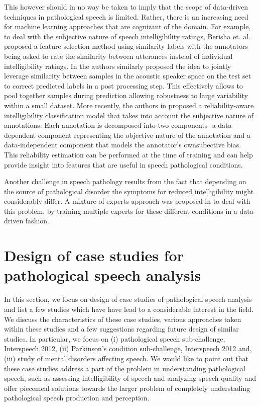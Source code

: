 \documentclass{article}
\begin{document}
This however should in no way be taken to imply that the scope of data-driven techniques in pathological speech is limited. Rather, there is an increasing need for machine learning approaches that are cognizant of the domain. For example, to deal with the subjective nature of speech intelligibility ratings, Berisha et. al. \cite{berisha2014modeling} proposed a feature selection method using similarity labels with the annotators being asked to rate the similarity between utterances instead of individual intelligibility ratings.
In \cite{kim2013pathology} the authors similarly proposed the idea to jointly leverage similarity between samples in the acoustic speaker space on the test set to correct predicted labels in a post processing step. This effectively allows to pool together samples during prediction allowing robustness to large variability within a small dataset.
More recently, the authors in \cite{kumar2015maxentrel} proposed a reliability-aware intelligibility classification model that takes into account the subjective nature of annotations. Each annotation is decomposed into two components- a data dependent component representing the objective nature of the annotation and a data-independent component that models the annotator's ownsubective bias. This reliability estimation can be performed at the time of training and can help provide insight into features that are useful in speech pathological conditions.

Another challenge in speech pathology results from the fact that depending on the source of pathological disorder the symptoms for reduced intelligibility might considerably differ. A mixture-of-experts approach was proposed in \cite{gupta2014pathology} to deal with this problem, by training multiple experts for these different conditions in a data-driven fashion.


\section{Design of case studies for pathological speech analysis}
In this section, we focus on design of case studies of pathological speech analysis and list a few studies which have have lead to a considerable interest in the field. 
We discuss the characteristics of these case studies, various approaches taken within these studies and a few suggestions regarding future design of similar studies. 
In particular, we focus on (i) pathological speech sub-challenge, Interspeech 2012, (ii) Parkinson's condition sub-challenge, Interspeech 2012 and, (iii) study of mental disorders affecting speech. 
We would like to point out that these case studies address a part of the problem in understanding pathological speech, such as assessing intelligibility of speech and analyzing speech quality and offer piecemeal solutions towards the larger problem of completely understading pathological speech production and perception.
\end{document}
